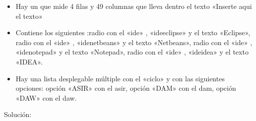 \documentclass[letterpaper,10pt,spanish]{sphinxmanual}
\begin{document}
\begin{itemize}
\item {} 
Hay un  que mide 4 filas y 49 columnas que lleva dentro el texto «Inserte aqui el texto»

\item {} 
Contiene los siguientes :radio con el   «ide» ,   «ideeclipse»  y el texto «Eclipse», radio con el   «ide» ,   «idenetbeans»  y el texto «Netbeans», radio con el   «ide» ,   «idenotepad»  y el texto «Notepad», radio con el   «ide» ,   «ideidea»  y el texto «IDEA».

\item {} 
Hay una lista desplegable múltiple con el  «ciclo» y con las siguientes opciones: opción «ASIR» con el  asir, opción «DAM» con el  dam, opción «DAW» con el  daw.

\end{itemize}


Solución:
\end{document}
